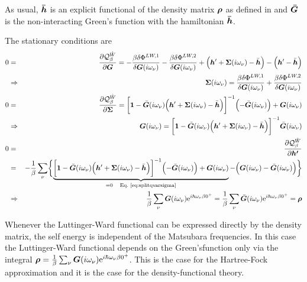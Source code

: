 \documentclass[11pt,a4paper]{report}
\begin{document}
As usual, $\bm{\bar{h}}$ is an explicit functional of the density
matrix $\bm{\rho}$ as defined in  and $\bm{\bar{G}}$
is the non-interacting Green's function with the hamiltonian
$\bm{\bar{h}}$.


The stationary conditions are
\begin{eqnarray}
0&=&
\frac{\partial\mathcal{Q}^{\hat{W}}_\beta}{\partial\mat{G}}
=-\frac{\beta\delta\Phi^{LW,1}}{\delta\mat{G}(i\omega_\nu)}
-\frac{\beta\delta\Phi^{LW,2}}{\delta\mat{G}(i\omega_\nu)}
+\Bigl(\mat{h}'+\mat{\Sigma}(i\omega_\nu)-\bar{\mat{h}}\Bigr)
-\Bigl(\mat{h}'-\bar{\mat{h}}\Bigr)
\nonumber\\
&\Rightarrow&\qquad
\mat{\Sigma}(i\omega_\nu)
=\frac{\beta\delta\Phi^{LW,1}}{\delta\mat{G}(i\omega_\nu)}
+\frac{\beta\delta\Phi^{LW,2}}{\delta\mat{G}(i\omega_\nu)}
\nonumber\\
0&=&
\frac{\partial\mathcal{Q}^{\hat{W}}_\beta}{\partial\mat{\Sigma}}
=
\biggl[\mat{1}-\bar{\mat{G}}(i\omega_\nu)
\Bigl(\mat{h}'+\mat{\Sigma}(i\omega_\nu)-\bar{\mat{h}}\Bigr)\biggr]^{-1}
\Bigl(-\bar{\mat{G}}(i\omega_\nu)\Bigr)+\mat{G}(i\omega_\nu)
\label{eq:splitqvarsigma}
\\
&\Rightarrow&\qquad
\mat{G}(i\omega_\nu)=\biggl[\mat{1}-\bar{\mat{G}}(i\omega_\nu)
\Bigl(\mat{h}'
+\mat{\Sigma}(i\omega_\nu)-\bar{\mat{h}}\Bigr)\biggr]^{-1}
\bar{\mat{G}}(i\omega_\nu)
\nonumber\\
0&=&
\frac{\partial\mathcal{Q}^{\hat{W}}_\beta}{\partial\mat{h'}}
\nonumber\\
&=&-\frac{1}{\beta}\sum_\nu\biggl\lbrace
\underbrace{\biggl[\mat{1}-\bar{\mat{G}}(i\omega_\nu)
\Bigl(\mat{h}'+\mat{\Sigma}(i\omega_\nu)-\bar{\mat{h}}\Bigr)\biggr]^{-1}
\Bigl(-\bar{\mat{G}}(i\omega_\nu)\Bigr)+\mat{G}(i\omega_\nu)}
_{=0\quad\text{\eq{eq:splitqvarsigma}}}
-\Bigl(\mat{G}(i\omega_\nu)
-\bar{\mat{G}}(i\omega_\nu)\Bigr)\biggr\rbrace
\nonumber\\
&\Rightarrow&\qquad
\frac{1}{\beta}\sum_\nu
\mat{G}(i\omega_\nu)\e{i\hbar\omega_\nu\beta0^+}
=\frac{1}{\beta}\sum_\nu
\bar{\mat{G}}(i\omega_\nu)\e{i\hbar\omega_\nu\beta0^+}
=\mat{\rho}
\end{eqnarray}

Whenever the Luttinger-Ward functional can be expressed directly by
the density matrix, the self energy is independent of the Matsubara
frequencies. In this case the Luttinger-Ward functional depends on the
Green'sfunction only via the integral $\bm{\rho}=
\frac{1}{\beta}\sum_\nu
\bm{G}(i\omega_\nu)\mathrm{e}^{i\hbar\omega_\nu\beta0^+}$. This is the case
for the Hartree-Fock approximation and it is the case for the
density-functional theory.
\end{document}

